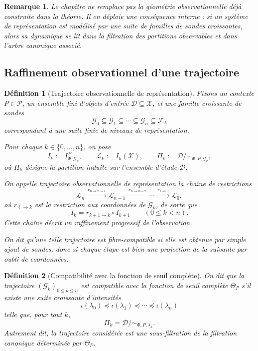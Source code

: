 \documentclass[11pt,a4paper]{article}
\newtheorem{definition}{Définition}
\newtheorem{remark}{Remarque}
\begin{document}
\begin{appendices}
\begin{remark}
Le chapitre ne remplace pas la géométrie observationnelle déjà construite dans la théorie. Il en déploie une conséquence interne : si un système de représentation est modélisé par une suite de familles de sondes croissantes, alors sa dynamique se lit dans la filtration des partitions observables et dans l'arbre canonique associé.
\end{remark}

\subsection{Raffinement observationnel d'une trajectoire}

\begin{definition}[Trajectoire observationnelle de représentation]
Fixons un contexte \(P\in\mathcal P\), un ensemble fini d'objets d'entrée \(\mathcal D\subseteq\mathcal X\), et une famille croissante de sondes
\[
\mathcal G_0\subseteq \mathcal G_1\subseteq \cdots \subseteq \mathcal G_n \subseteq \mathcal F_\lambda
\]
correspondant à une suite finie de niveaux de représentation.

Pour chaque \(k\in\{0,\ldots,n\}\), on pose
\[
I_k:=I_{\Phi,\mathcal G_k}^P,
\qquad
\mathcal L_k:=I_k(\mathcal X),
\qquad
\Pi_k:=\mathcal D/{\sim_{\Phi,P,\mathcal G_k}},
\]
où \(\Pi_k\) désigne la partition induite sur l'ensemble d'étude \(\mathcal D\).

On appelle \emph{trajectoire observationnelle de représentation} la chaîne de restrictions
\[
\mathcal L_n
\xrightarrow{\,r_{n\to n-1}\,}
\mathcal L_{n-1}
\xrightarrow{\,r_{n\to n-2}\,}
\cdots
\xrightarrow{\,r_{1\to 0}\,}
\mathcal L_0,
\]
où \(r_{\ell\to k}\) est la restriction aux coordonnées de \(\mathcal G_k\), de sorte que
\[
I_k=r_{k+1\to k}\circ I_{k+1}
\qquad (0\le k<n).
\]
Cette chaîne décrit un raffinement progressif de l'observation.

On dit qu'une telle trajectoire est \emph{fibre-compatible} si elle est obtenue par simple ajout de sondes, donc si chaque étape est bien une projection de la suivante par oubli de coordonnées.
\end{definition}

\begin{definition}[Compatibilité avec la fonction de seuil complète]
On dit que la trajectoire \((\mathcal G_k)_{0\le k\le n}\) est \emph{compatible avec} la fonction de seuil complète \(\Theta_P\) s'il existe une suite croissante d'intensités
\[
\iota(\lambda_0)\preceq \iota(\lambda_1)\preceq \cdots \preceq \iota(\lambda_n)
\]
telle que, pour tout \(k\),
\[
\Pi_k=\mathcal D/{\sim_{\Phi,P,\lambda_k}}.
\]
Autrement dit, la trajectoire considérée est une sous-filtration de la filtration canonique déterminée par \(\Theta_P\).
\end{definition}


\end{appendices}
\end{document}
